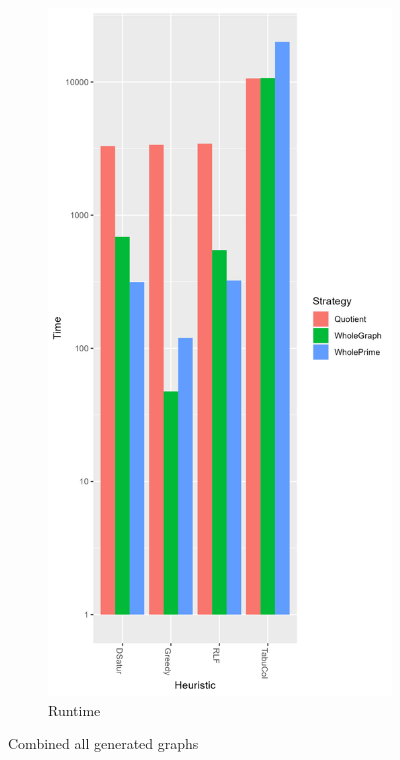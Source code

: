 \documentclass[a4paper]{article}
\begin{document}
\begin{figure}[p]
\begin{subfigure}{.4\paperwidth}
    \end{subfigure}%
    \begin{subfigure}{.4\paperwidth}
        \includegraphics[width=\columnwidth]{Tables/GeneratedTime.png}
      \caption{Runtime}
      \label{fig:generatedt}
    \end{subfigure}
\caption{Combined all generated graphs}
\label{fig:generated}
\end{figure}
\end{document}
